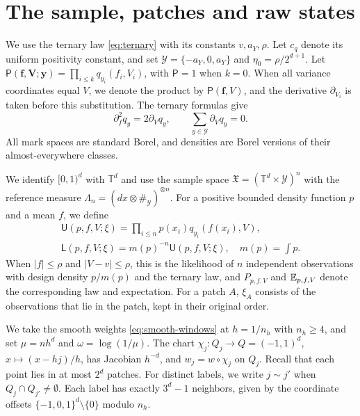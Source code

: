 \section{The sample, patches and raw states}\label{sec:LB-setup}

We use the ternary law \eqref{eq:ternary} with its constants
$v,a_Y,\rho$. Let $c_q$ denote its uniform positivity constant, and set
$\mathcal Y=\{-a_Y,0,a_Y\}$ and $\eta_0=\rho/2^{d+1}$. Let
$\mathsf P(\mathbf f,\mathbf V;\mathbf y)=\prod_{i\le k}q_{y_i}(f_i,V_i)$,
with $\mathsf P=1$ when $k=0$. When all variance coordinates equal
$V$, we denote the product by $\mathsf P(\mathbf f,V)$, and the derivative
$\partial_{V_i}$ is taken before this substitution. The ternary formulas give
\begin{equation}\label{eq:LB-heat-one}
 \partial_f^2q_y=2\partial_Vq_y,\qquad
 \sum_{y\in\mathcal Y}\partial_Vq_y=0.
\end{equation}
All mark spaces are standard Borel, and densities are Borel versions
of their almost-everywhere classes.

We identify $[0,1)^d$ with $\mathbb T^d$ and use the sample
space $\mathfrak X=(\mathbb T^d\times\mathcal Y)^n$ with the reference
measure $\Lambda_n=(dx\otimes\#_{\mathcal Y})^{\otimes n}$. For a
positive bounded density function $p$ and a mean $f$, we define
\begin{equation}\label{eq:LB-likelihood}
 \begin{gathered}
 \mathsf U(p,f,V;\xi)=\prod_{i\le n}p(x_i)q_{y_i}(f(x_i),V),\\
 \mathsf L(p,f,V;\xi)=m(p)^{-n}\mathsf U(p,f,V;\xi),\quad m(p)=\int p.
 \end{gathered}
\end{equation}
When $|f|\le\rho$ and $|V-v|\le\rho$, this is the likelihood of $n$
independent observations with design density $p/m(p)$ and the ternary
law, and $P_{p,f,V}$ and $\mathbb E_{p,f,V}$ denote the
corresponding law and expectation. For a patch $A$, $\xi_A$ consists
of the observations that lie in the patch, kept in their original
order.

We take the smooth weights \eqref{eq:smooth-windows} at $h=1/n_h$ with
$n_h\ge4$, and set $\mu=nh^d$ and $\omega=\log(1/\mu)$. The chart
$\chi_j:Q_j\to Q=(-1,1)^d$, $x\mapsto(x-hj)/h$, has Jacobian $h^{-d}$,
and $w_j=w\circ\chi_j$ on $Q_j$. Recall that each point lies in at most
$2^d$ patches. For distinct labels, we write $j\sim j'$ when
$Q_j\cap Q_{j'}\ne\emptyset$. Each label has exactly $3^d-1$
neighbors, given by the coordinate offsets
$\{-1,0,1\}^d\setminus\{0\}$ modulo $n_h$.

